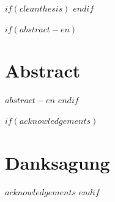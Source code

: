 \renewcommand{\figurename}{Figure}
\renewcommand{\tablename}{Table}

$if(cleanthesis)$
\clearpage
\customtitlebackpage
$endif$




\begin{minipage}{\linewidth}

$if(abstract-en)$
\chapter*{Abstract}
$abstract-en$
$endif$

\end{minipage}
\cleardoublepage




$if(acknowledgements)$
\chapter*{Danksagung}
$acknowledgements$
$endif$




\cleardoublepage
